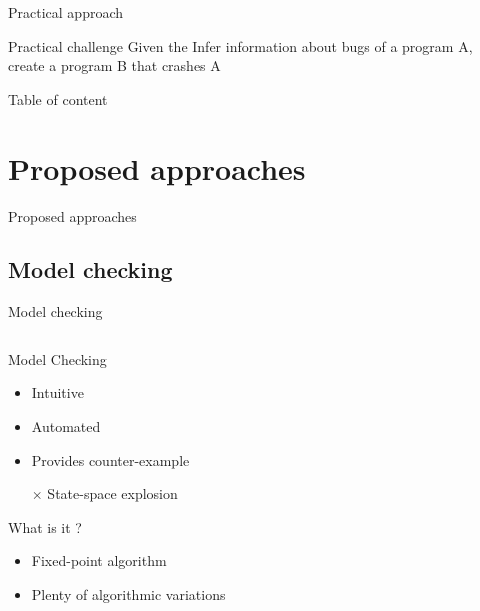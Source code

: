 \documentclass{beamer}
\begin{document}
\begin{frame}{Practical approach}

\begin{block}{Practical challenge}
Given the Infer information about bugs of a program A, create a program B that crashes A
\end{block}

\end{frame}

\begin{frame}{Table of content}
\tableofcontents
\end{frame}

\section{Proposed approaches}

\begin{frame}
\centering

P\LARGE roposed approaches
\end{frame}


\subsection{Model checking}

\begin{frame}{Model checking }

\begin{columns}[t]
\begin{column}{5cm}
\begin{block}{ Model Checking }
\begin{itemize}
\item Intuitive 
\item Automated 
\item Provides counter-example 
\item[$\times$] State-space explosion
\end{itemize}
\end{block}

\begin{block}{What is it ? }
\begin{itemize}
\item Fixed-point algorithm 
\item Plenty of algorithmic variations
\end{itemize}

\end{block}
\end{column}

\begin{column}{5cm}

\end{column}
\end{columns}

\end{frame}
\end{document}
